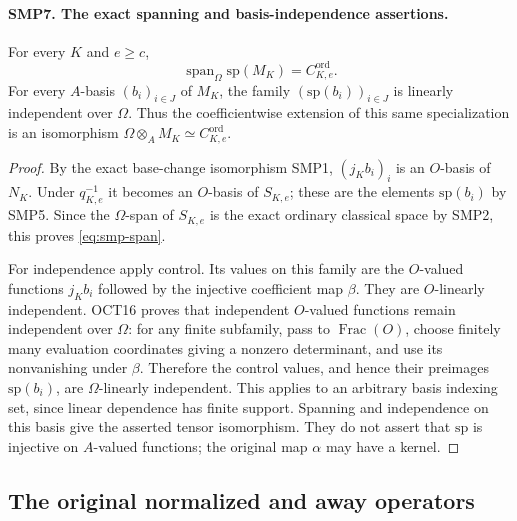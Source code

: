 \paragraph{SMP7. The exact spanning and basis-independence assertions.}
\label{claim:SMP7}
For every $K$ and $e\geq c$,
\begin{equation}\label{eq:smp-span}
      \operatorname{span}_\Omega\mathrm{sp}(M_K)
                             =C^{\mathrm{ord}}_{K,e}.
\end{equation}
For every $A$-basis $(b_i)_{i\in J}$ of $M_K$, the
family $(\mathrm{sp}(b_i))_{i\in J}$ is linearly
independent over $\Omega$.  Thus the coefficientwise
extension of this same specialization is an isomorphism
$\Omega\otimes_A M_K\simeq C^{\mathrm{ord}}_{K,e}$.
\begin{proof}
By the exact base-change isomorphism SMP1,
$(j_K b_i)_i$ is an $O$-basis of $N_K$.  Under
$q_{K,e}^{-1}$ it becomes an $O$-basis of $S_{K,e}$;
these are the elements $\mathrm{sp}(b_i)$ by SMP5.
Since the $\Omega$-span of $S_{K,e}$ is the exact
ordinary classical space by SMP2, this proves
\eqref{eq:smp-span}.

For independence apply control.  Its values on this
family are the $O$-valued functions $j_K b_i$ followed
by the injective coefficient map $\beta$.
They are $O$-linearly independent.  OCT16 proves that
independent $O$-valued functions remain independent
over $\Omega$: for any finite subfamily, pass to
$\operatorname{Frac}(O)$, choose finitely many evaluation
coordinates giving a nonzero determinant, and use its
nonvanishing under $\beta$.  Therefore the control
values, and hence their preimages
$\mathrm{sp}(b_i)$, are $\Omega$-linearly independent.
This applies to an arbitrary basis indexing set,
since linear dependence has finite support.
Spanning and independence on this basis give the
asserted tensor isomorphism.  They do not assert that
$\mathrm{sp}$ is injective on $A$-valued functions;
the original map $\alpha$ may have a kernel.
\end{proof}

\subsection{The original normalized and away operators}

